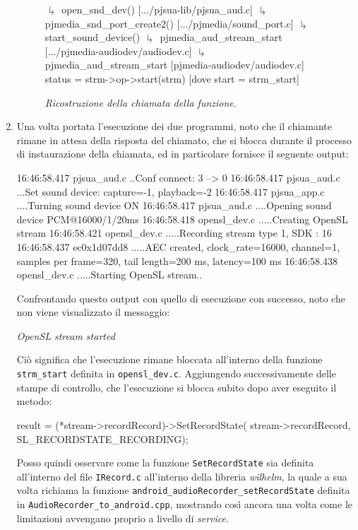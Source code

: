 \begin{enumerate}
\begin{figure}[!t]
\begin{cpp}[mathescape=true]
$\drsh$ open_snd_dev() [.../pjsua-lib/pjsua_aud.c]
  $\drsh$ pjmedia_snd_port_create2() [.../pjmedia/sound_port.c]
    $\drsh$ start_sound_device() 
      $\drsh$ pjmedia_aud_stream_start [.../pjmedia-audiodev/audiodev.c]
        $\drsh$ pjmedia_aud_stream_start [pjmedia-audiodev/audiodev.c]
           { status = strm->op->start(strm) } [dove start = strm_start]
\end{cpp}
\caption{\textit{Ricostruzione della chiamata della funzione}.}
\end{figure}

\item Una volta portata l'esecuzione dei due programmi, noto che il chiamante
	rimane in attesa della risposta del chiamato, che si blocca durante il
	processo di instaurazione della chiamata, ed in particolare fornisce il
	seguente output:
\begin{bash}
16:46:58.417    pjsua_aud.c  ..Conf connect: 3 --> 0
16:46:58.417    pjsua_aud.c  ...Set sound device: capture=-1, playback=-2
16:46:58.417    pjsua_app.c  ....Turning sound device ON
16:46:58.417    pjsua_aud.c  ....Opening sound device PCM@16000/1/20ms
16:46:58.418   opensl_dev.c  .....Creating OpenSL stream
16:46:58.421   opensl_dev.c  .....Recording stream type 1, SDK : 16
16:46:58.437    ec0x1d07dd8  .....AEC created, clock_rate=16000, channel=1, samples per frame=320, tail length=200 ms, latency=100 ms
16:46:58.438   opensl_dev.c  .....Starting OpenSL stream..
\end{bash} 
	Confrontando questo output con quello di esecuzione con successo,
	noto che non viene visualizzato il messaggio:
	\begin{center}
	\textit{OpenSL stream started}
	\end{center}
	Ciò significa  che l'esecuzione rimane bloccata all'interno della 
	funzione \texttt{\small strm\_start} definita in \texttt{\small opensl\_dev.c}.
	Aggiungendo successivamente delle stampe di controllo, che l'esecuzione
	si blocca subito dopo aver eseguito il metodo:
\begin{clang}
result = (*stream->recordRecord)->SetRecordState(
                     stream->recordRecord, SL_RECORDSTATE_RECORDING);
\end{clang}
	Posso quindi osservare come la funzione \texttt{\small SetRecordState} sia
	definita all'interno del file \texttt{\small IRecord.c} all'interno della
	libreria \textit{wilhelm}, la quale a sua volta richiama la funzione 
	\texttt{\small android\_audioRecorder\_setRecordState} definita in 
	\texttt{\small AudioRecorder\_to\_android.cpp}, mostrando così ancora una
	volta come le limitazioni avvengano proprio a livello di \textit{service}.
	

\end{enumerate}
